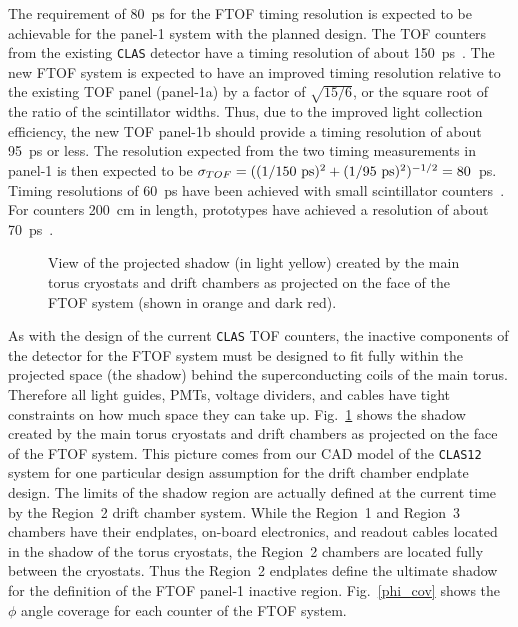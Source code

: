 The requirement of 80~ps for the FTOF timing resolution is expected to be
achievable for the panel-1 system with the planned design.  The TOF counters 
from the existing {\tt CLAS} detector have a timing resolution of about 
150~ps~\cite{smith1}.  The new FTOF system is expected to have an improved 
timing resolution relative to the existing TOF panel (panel-1a) by a factor 
of $\sqrt{15/6}$, or the square root of the ratio of the scintillator widths.  
Thus, due to the improved light collection efficiency, the new TOF panel-1b
should provide a timing resolution of about 95~ps or less.  The resolution 
expected from the two timing measurements in panel-1 is then expected to be 
$\sigma_{TOF} = ((1/150~{\rm ps})^2 + (1/95~{\rm ps})^2)^{-1/2} = 80$~ps.  
Timing resolutions of 60~ps have been achieved with small scintillator 
counters~\cite{kim}.  For counters 200~cm in length, prototypes have achieved 
a resolution of about 70~ps~\cite{chen}.

\begin{figure}[htbp]
\vspace{12.0cm}
\caption{\small{View of the projected shadow (in light yellow) created by the 
main torus cryostats and drift chambers as projected on the face of the FTOF 
system (shown in orange and dark red).}}
\label{shadow1}
\end{figure}

As with the design of the current {\tt CLAS} TOF counters, the inactive
components of the detector for the FTOF system must be designed to fit
fully within the projected space (the shadow) behind the superconducting 
coils of the main torus.  Therefore all light guides, PMTs, voltage 
dividers, and cables have tight constraints on how much space they can 
take up.  Fig.~\ref{shadow1} shows the shadow created by the main torus 
cryostats and drift chambers as projected on the face of the FTOF system.  
This picture comes from our CAD model of the {\tt CLAS12} system for one 
particular design assumption for the drift chamber endplate design.  The 
limits of the shadow region are actually defined at the current time by 
the Region~2 drift chamber system.  While the Region~1 and Region~3 
chambers have their endplates, on-board electronics, and readout cables 
located in the shadow of the torus cryostats, the Region~2 chambers are 
located fully between the cryostats.  Thus the Region~2 endplates define
the ultimate shadow for the definition of the FTOF panel-1 inactive
region.  Fig.~\ref{phi_cov} shows the $\phi$ angle coverage for each
counter of the FTOF system.

